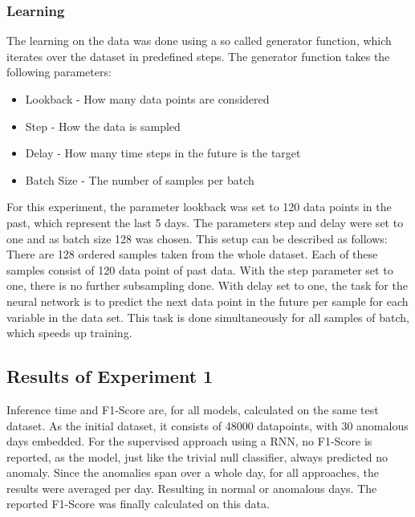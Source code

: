\subsubsection{Learning}
The learning on the data was done using a so called generator function, which iterates over the dataset in predefined steps. The generator function takes the following parameters:

\begin{itemize}
	\item Lookback - How many data points are considered
	\item Step - How the data is sampled
	\item Delay - How many time steps in the future is the target
	\item Batch Size - The number of samples per batch
\end{itemize}

For this experiment, the parameter lookback was set to 120 data points in the past, which represent the last 5 days. The parameters step and delay were set to one and as batch size 128 was chosen. This setup can be described as follows: There are 128 ordered samples taken from the whole dataset. Each of these samples consist of 120 data point of past data. With the step parameter set to one, there is no further subsampling done. With delay set to one, the task for the neural network is to predict the next data point in the future per sample for each variable in the data set. This task is done simultaneously for all samples of batch, which speeds up training.

\subsection{Results of Experiment 1}

Inference time and F1-Score are, for all models, calculated on the same test dataset. As the initial dataset, it consists of 48000 datapoints, with 30 anomalous days embedded. For the supervised approach using a RNN, no F1-Score is reported, as the model, just like the trivial null classifier, always predicted no anomaly. Since the anomalies span over a whole day, for all approaches, the results were averaged per day. Resulting in normal or anomalous days. The reported F1-Score was finally calculated on this data. 


